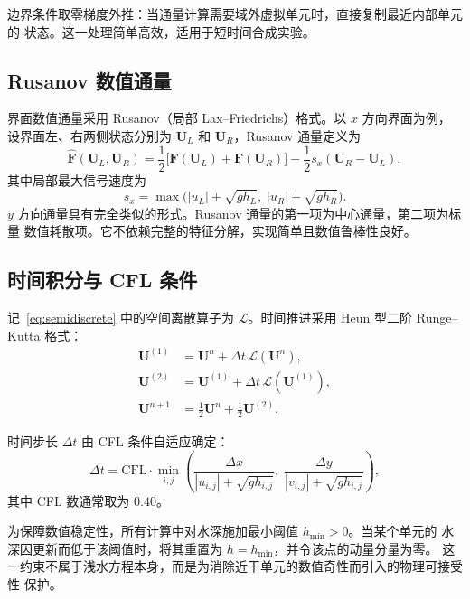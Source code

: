 \documentclass[12pt,a4paper]{article}
\newcommand{\U}{\bm{U}}
\newcommand{\F}{\bm{F}}
\begin{document}
边界条件取零梯度外推：当通量计算需要域外虚拟单元时，直接复制最近内部单元的
状态。这一处理简单高效，适用于短时间合成实验。

\subsection{Rusanov 数值通量}

界面数值通量采用 Rusanov（局部 Lax--Friedrichs）格式。以 $x$ 方向界面为例，
设界面左、右两侧状态分别为 $\U_L$ 和 $\U_R$，Rusanov 通量定义为
\begin{equation}
  \widehat{\F}(\U_L, \U_R)
  =
  \frac{1}{2}\bigl[\F(\U_L) + \F(\U_R)\bigr]
  - \frac{1}{2}s_x(\U_R - \U_L),
  \label{eq:rusanov-x}
\end{equation}
其中局部最大信号速度为
\begin{equation}
  s_x = \max\bigl(|u_L| + \sqrt{gh_L},\; |u_R| + \sqrt{gh_R}\bigr).
  \label{eq:smax}
\end{equation}
$y$ 方向通量具有完全类似的形式。Rusanov 通量的第一项为中心通量，第二项为标量
数值耗散项。它不依赖完整的特征分解，实现简单且数值鲁棒性良好。

\subsection{时间积分与 CFL 条件}

记~\eqref{eq:semidiscrete} 中的空间离散算子为 $\mathcal{L}$。时间推进采用
Heun 型二阶 Runge--Kutta 格式：
\begin{align}
  \U^{(1)} &= \U^n + \Delta t\,\mathcal{L}(\U^n), \label{eq:rk2-stage1} \\
  \U^{(2)} &= \U^{(1)} + \Delta t\,\mathcal{L}(\U^{(1)}), \label{eq:rk2-stage2} \\
  \U^{n+1} &= \frac{1}{2}\U^n + \frac{1}{2}\U^{(2)}. \label{eq:rk2-final}
\end{align}

时间步长 $\Delta t$ 由 CFL 条件自适应确定：
\begin{equation}
  \Delta t
  = \mathrm{CFL} \cdot
  \min_{i,j}\left(
    \frac{\Delta x}{|u_{i,j}| + \sqrt{gh_{i,j}}},\;
    \frac{\Delta y}{|v_{i,j}| + \sqrt{gh_{i,j}}}
  \right),
  \label{eq:cfl}
\end{equation}
其中 CFL 数通常取为 $0.40$。

为保障数值稳定性，所有计算中对水深施加最小阈值 $h_{\min} > 0$。当某个单元的
水深因更新而低于该阈值时，将其重置为 $h = h_{\min}$，并令该点的动量分量为零。
这一约束不属于浅水方程本身，而是为消除近干单元的数值奇性而引入的物理可接受性
保护。
\end{document}
